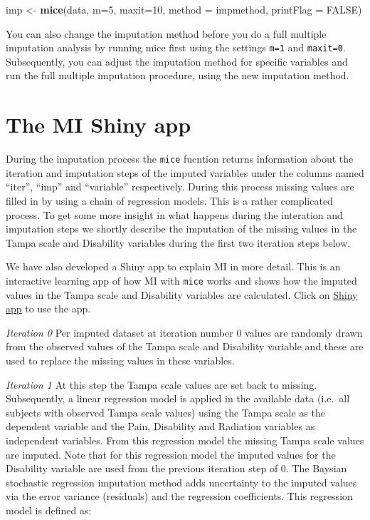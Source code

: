 \documentclass[
]{book}
\newenvironment{Shaded}{\begin{snugshade}}{\end{snugshade}}
\newcommand{\DataTypeTok}[1]{\textcolor[rgb]{0.13,0.29,0.53}{#1}}
\newcommand{\DecValTok}[1]{\textcolor[rgb]{0.00,0.00,0.81}{#1}}
\newcommand{\KeywordTok}[1]{\textcolor[rgb]{0.13,0.29,0.53}{\textbf{#1}}}
\newcommand{\NormalTok}[1]{#1}
\newcommand{\OtherTok}[1]{\textcolor[rgb]{0.56,0.35,0.01}{#1}}
\newcommand{\StringTok}[1]{\textcolor[rgb]{0.31,0.60,0.02}{#1}}
\begin{document}
\begin{Shaded}
\begin{Highlighting}[]
\NormalTok{imp <-}\StringTok{ }\KeywordTok{mice}\NormalTok{(data, }\DataTypeTok{m=}\DecValTok{5}\NormalTok{, }\DataTypeTok{maxit=}\DecValTok{10}\NormalTok{, }\DataTypeTok{method =}\NormalTok{ impmethod,  }\DataTypeTok{printFlag =} \OtherTok{FALSE}\NormalTok{)}
\end{Highlighting}
\end{Shaded}

You can also change the imputation method before you do a full multiple imputation analysis by running mice first using the settings \texttt{m=1} and \texttt{maxit=0}. Subsequently, you can adjust the imputation method for specific variables and run the full multiple imputation procedure, using the new imputation method.

\hypertarget{the-mi-shiny-app}{%
\section{The MI Shiny app}\label{the-mi-shiny-app}}

During the imputation process the \texttt{mice} fucntion returns information about the iteration and imputation steps of the imputed variables under the columns named ``iter'', ``imp'' and ``variable'' respectively. During this process missing values are filled in by using a chain of regression models. This is a rather complicated process. To get some more insight in what happens during the interation and imputation steps we shortly describe the imputation of the missing values in the Tampa scale and Disability variables during the first two iteration steps below.

We have also developed a Shiny app to explain MI in more detail. This is an interactive learning app of how MI with \texttt{mice} works and shows how the imputed values in the Tampa scale and Disability variables are calculated. Click on \href{https://missingdata.shinyapps.io/mi2variables/}{Shiny app} to use the app.

\emph{Iteration 0}
Per imputed dataset at iteration number 0 values are randomly drawn from the observed values of the Tampa scale and Disability variable and these are used to replace the missing values in these variables.

\emph{Iteration 1}
At this step the Tampa scale values are set back to missing. Subsequently, a linear regression model is applied in the available data (i.e.~all subjects with observed Tampa scale values) using the Tampa scale as the dependent variable and the Pain, Disability and Radiation variables as independent variables. From this regression model the missing Tampa scale values are imputed. Note that for this regression model the imputed values for the Disability variable are used from the previous iteration step of 0. The Baysian stochastic regression imputation method adds uncertainty to the imputed values via the error variance (residuals) and the regression coefficients. This regression model is defined as:
\end{document}
